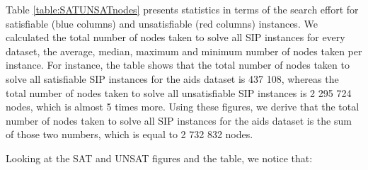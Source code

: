 \documentclass{l4proj}
\begin{document}
Table \ref{table:SATUNSATnodes} presents statistics in terms of the search effort for satisfiable (blue columns) and unsatisfiable (red columns) instances. We calculated the total number of nodes taken to solve all SIP instances for every dataset, the average, median, maximum and minimum number of nodes taken per instance. For instance, the table shows that the total number of nodes taken to solve all satisfiable SIP instances for the aids dataset is 437 108, whereas the total number of nodes taken to solve all unsatisfiable SIP instances is 2 295 724 nodes, which is almost 5 times more. Using these figures, we derive that the total number of nodes taken to solve all SIP instances for the aids dataset is the sum of those two numbers, which is equal to 2 732 832 nodes.

Looking at the SAT and UNSAT figures and the table, we notice that:
\end{document}

